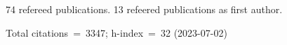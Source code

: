 74 refereed publications. 13 refeered publications as first author.

Total citations~=~3347; h-index~=~32 (2023-07-02)
